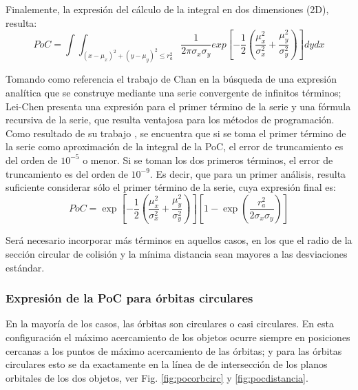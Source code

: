 {Finalemente, la expresi\'on del c\'alculo de la integral en dos dimensiones (2D), resulta:\\

\begin{equation}
 PoC=\int \int_{(x-\mu_{x})^{2}+(y-\mu_{y})^{2}\leq r_{a}^{2}} \frac{1}{2\pi\sigma_{x}\sigma_{y}} exp [-\frac{1}{2}(\frac{\mu_{x}^{2}}{\sigma_{x}^{2}}+\frac{\mu_{y}^{2}}{\sigma_{y}^{2}}) ] dy dx
 \label{eq:pocintegral}
\end{equation}

Tomando como referencia el trabajo de Chan \citep{chan2003improved} en la b\'usqueda de una expresi\'on anal\'itica que se construye mediante una serie convergente de infinitos t\'erminos; Lei-Chen presenta una expresi\'on para el primer t\'ermino de la serie y una f\'ormula recursiva de la serie, que resulta ventajosa para los m\'etodos de programaci\'on.\\

Como resultado de su trabajo \citep{lei2009rapid}, se encuentra que si se toma el primer t\'ermino de la serie como aproximaci\'on de la integral de la PoC,  el error de truncamiento es del orden de $10^{-5}$ o menor. Si se toman los dos primeros t\'erminos, el error de truncamiento es del orden de $10^{-9}$. Es decir, que para un primer an\'alisis, resulta suficiente considerar s\'olo el primer t\'ermino de la serie, cuya expresi\'on final es:\\


\begin{equation}
 PoC= \exp[-\frac{1}{2}(\frac{\mu_{x}^{2}}{\sigma_{x}^{2}}+\frac{\mu_{y}^{2}}{\sigma_{y}^{2}})][1-\exp(\frac{r_{a}^{2}}{2\sigma_{x}\sigma_{y}})]
 \label{eq:pocexpress}
\end{equation}

Ser\'a necesario incorporar m\'as t\'erminos en aquellos casos, en los que el radio de la secci\'on circular de colisi\'on y la m\'inima distancia sean mayores a las desviaciones est\'andar.

\subsubsection*{Expresi\'on de la PoC para \'orbitas circulares}

En la mayor\'ia de los casos, las \'orbitas son circulares o casi circulares. En esta configuraci\'on el m\'aximo acercamiento de los objetos ocurre siempre en posiciones cercanas a los puntos de m\'aximo acercamiento de las \'orbitas; y para las \'orbitas circulares esto se da exactamente en la l\'inea de de intersecci\'on de los planos orbitales de los dos objetos, ver Fig. \ref{fig:pocorbcirc} y \ref{fig:pocdistancia}.\\

}
